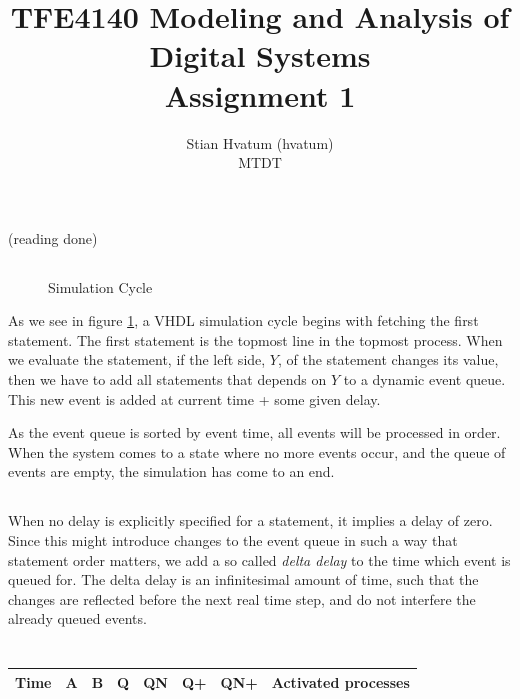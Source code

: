 \documentclass[english,a4paper]{report}
\title{TFE4140 Modeling and Analysis of Digital Systems\\
\Huge Assignment 1}
\author{Stian Hvatum (hvatum)\\MTDT}
\begin{document}
\maketitle
\newpage
\section{}
\subsection{}
(reading done)
\subsection{}
\begin{figure}

\caption{Simulation Cycle}
\label{dia:simcycle}
\end{figure}
As we see in figure \ref{dia:simcycle}, a VHDL simulation cycle begins with fetching the first statement.
The first statement is the topmost line in the topmost process.
When we evaluate the statement, if the left side, $Y$, of the statement changes its value, then we have to add
all statements that depends on $Y$ to a dynamic event queue. This new event is added at current time + some given delay.

As the event queue is sorted by event time, all events will be processed in order. When the system comes to a state where no more
events occur, and the queue of events are empty, the simulation has come to an end.

\subsection{}
When no delay is explicitly specified for a statement, it implies a delay of zero. Since this might introduce changes to the
event queue in such a way that statement order matters, we add a so called \textit{delta delay} to the time which event is queued for.
The delta delay is an infinitesimal amount of time, such that the changes are reflected before the next real time step,
and do not interfere the already queued events.

\section{}
\subsection{}
\begin{tabular}{l|c|c|c|c|c|c|l}
    Time	&A	&B	&Q	&QN	&Q+	&QN+	&Activated processes\\
    \hline
    \hline
    
\end{tabular}
\end{document}

